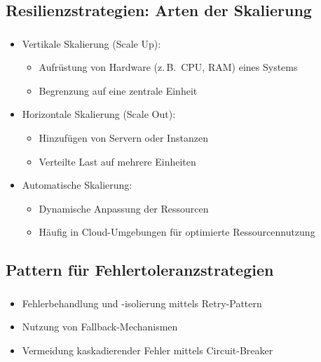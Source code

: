 \subsection{Resilienzstrategien: Arten der Skalierung}
\begin{frame}
    \frametitle{\insertsection}
    \framesubtitle{\insertsubsection}

        \begin{itemize}
            \item Vertikale Skalierung (Scale Up):
            \begin{itemize}
                \item Aufrüstung von Hardware (z.\,B.\ CPU, RAM) eines Systems
                \item Begrenzung auf eine zentrale Einheit
            \end{itemize}
            \item Horizontale Skalierung (Scale Out):
            \begin{itemize}
                \item Hinzufügen von Servern oder Instanzen
                \item Verteilte Last auf mehrere Einheiten
            \end{itemize}
            \item Automatische Skalierung:
            \begin{itemize}
                \item Dynamische Anpassung der Ressourcen
                \item Häufig in Cloud-Umgebungen für optimierte Ressourcennutzung
            \end{itemize}
        \end{itemize}
\end{frame}



\subsection{\textbf{Pattern für Fehlertoleranzstrategien}}

\begin{frame}
    \frametitle{\insertsection}
    \framesubtitle{\insertsubsection}

    \begin{itemize}
        \item Fehlerbehandlung und -isolierung mittels Retry-Pattern
        \item Nutzung von Fallback-Mechanismen
        \item Vermeidung kaskadierender Fehler mittels Circuit-Breaker
    \end{itemize}
\end{frame}


